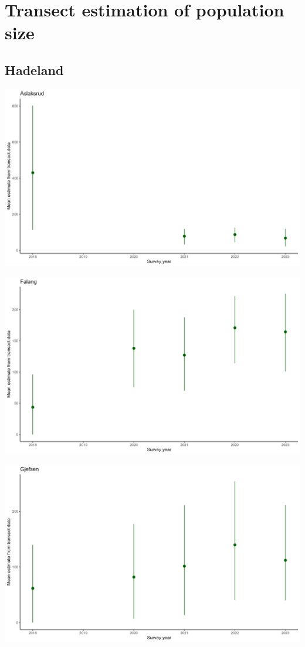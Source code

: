 \documentclass[
  letterpaper,
  DIV=11,
  numbers=noendperiod]{scrreport}
\begin{document}

\hypertarget{transect-estimation-of-population-size}{%
\chapter{Transect estimation of population
size}\label{transect-estimation-of-population-size}}

\hypertarget{hadeland-3}{%
\section{Hadeland}\label{hadeland-3}}

\includegraphics{Figurer/trans_Est/Aslaksrud_plot.png}

\includegraphics{Figurer/trans_Est/Falang_plot.png}

\includegraphics{Figurer/trans_Est/Gjefsen_plot.png}
\end{document}
